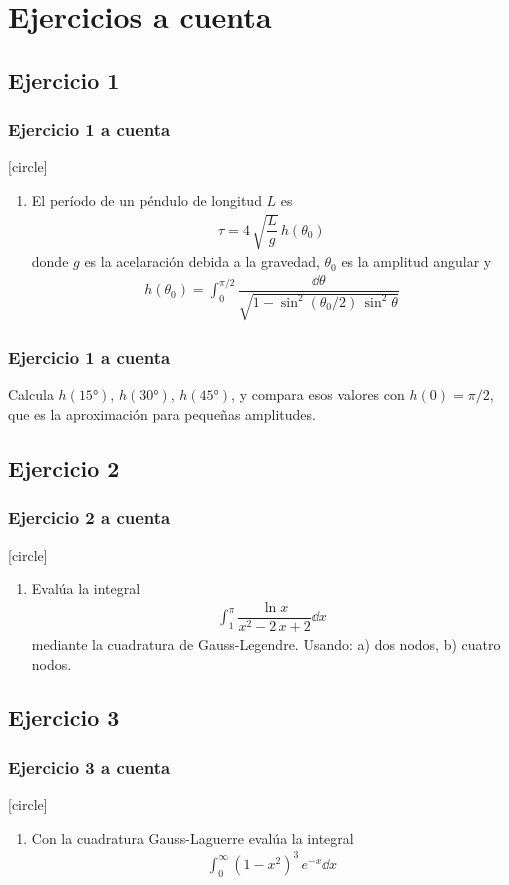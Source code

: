 \section{Ejercicios a cuenta}
\subsection*{Ejercicio 1}
\begin{frame}
\frametitle{Ejercicio 1 a cuenta}
[circle]
\begin{enumerate}[<+->]
\item El período de un péndulo de longitud $L$ es
\begin{align*}
\tau = 4 \, \sqrt{\dfrac{L}{g}} \, h(\theta_0)
\end{align*}
donde $g$ es la acelaración debida a la gravedad, $\theta_{0}$ es la amplitud angular y 
\begin{align*}
h(\theta_{0}) = \int_{0}^{\pi/2} \dfrac{\dd{\theta}}{\sqrt{1 - \sin^{2} (\theta_{0}/2) \, \sin^{2} \theta}}
\end{align*}
\seti
\end{enumerate}
\end{frame}
\begin{frame}
\frametitle{Ejercicio 1 a cuenta}
Calcula $h(\ang{15})$, $h(\ang{30})$, $h(\ang{45})$, y compara esos valores con $h(0) = \pi/2$, que es la aproximación para pequeñas amplitudes.
\end{frame}
\subsection*{Ejercicio 2}
\begin{frame}
\frametitle{Ejercicio 2 a cuenta}
[circle]
\begin{enumerate}[<+->]
\conti
\item Evalúa la integral
\begin{align*}
\int_{1}^{\pi} \dfrac{\ln x}{x^{2} - 2 \, x + 2} \dd{x}
\end{align*}
mediante la cuadratura de Gauss-Legendre. Usando: a) dos nodos, b) cuatro nodos.
\seti
\end{enumerate}
\end{frame}
\subsection*{Ejercicio 3}
\begin{frame}
\frametitle{Ejercicio 3 a cuenta}
[circle]
\begin{enumerate}[<+->]
\conti
\item Con la cuadratura Gauss-Laguerre evalúa la integral
\begin{align*}
\int_{0}^{\infty} (1 - x^{2})^{3} \, e^{-x} \dd{x}
\end{align*}
\seti
\end{enumerate}
\end{frame}
